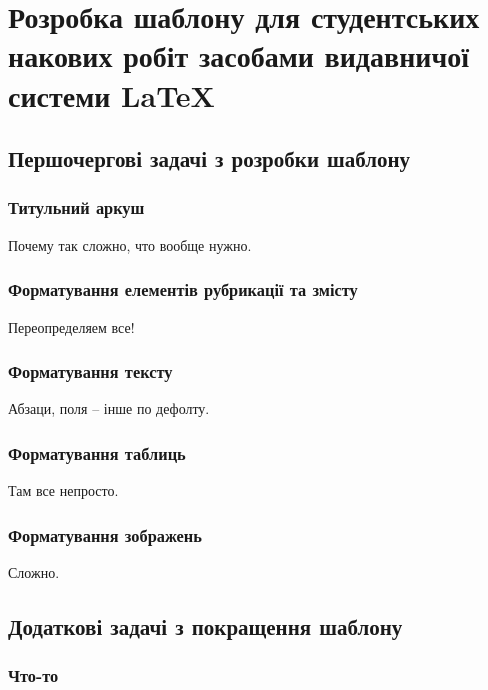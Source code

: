 \chapter{Розробка шаблону для студентських накових робіт засобами видавничої системи \LaTeX{}} 
\label{chap:second}
%
%
%
%
%
\section{Першочергові задачі з розробки шаблону}
%
%
\subsection{Титульний аркуш}
Почему так сложно, что вообще нужно.
%
%
\subsection{Форматування елементів рубрикації та змісту}
Переопределяем все!
%
%
\subsection{Форматування тексту}
Абзаци, поля -- інше по дефолту.
%
%
\subsection{Форматування таблиць}
Там все непросто.
%
%
\subsection{Форматування зображень}
Сложно.
%
%
%
%
%
\section{Додаткові задачі з покращення шаблону}
%
%
\subsection{Что-то}


